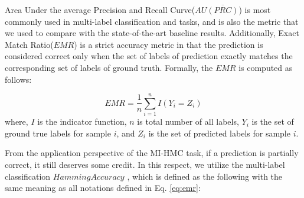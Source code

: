 \documentclass[wcp]{jmlr}
\begin{document}

Area Under the average Precision and Recall Curve($AU\overline{(PRC)}$)  \cite{Giunchiglia01,Sorower01} is most commonly used in multi-label classification and tasks, %
and is also the metric that we used to compare with the state-of-the-art baseline results.
Additionally, Exact Match Ratio($EMR$) \cite{Sorower01} is a strict accuracy metric in that the prediction is considered correct only when the set of labels of prediction exactly matches the corresponding set of labels of ground truth. Formally, the $EMR$ is computed as follows:

\begin{equation}\label{eq:emr}
EMR = \frac{1}{n} \sum_{i=1}^n I\left(Y_i=Z_i\right)
\end{equation}
where, $I$ is the indicator function, $n$ is total number of all labels, $Y_i$ is the set of ground true labels for sample $i$, and $Z_i$ is the set of predicted labels for sample $i$.

From the application perspective of the MI-HMC task, if a prediction is partially correct, it still deserves some credit. %
In this respect, we utilize the multi-label classification $HammingAccuracy$ \cite{Sorower01}, which is defined as the following with the same meaning as all notations defined in Eq. \ref{eq:emr}:
\end{document}
